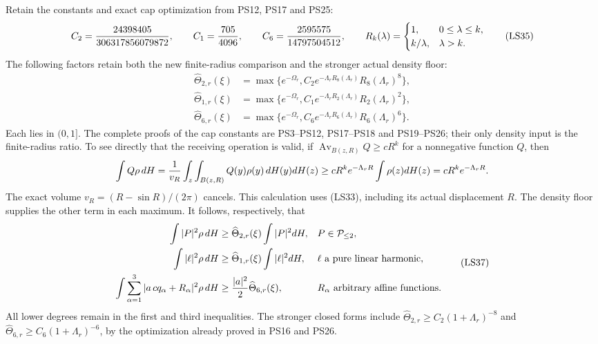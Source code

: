 \documentclass[11pt]{article}
\begin{document}
Retain the constants and exact cap optimization from PS12,
PS17 and PS25:
\[
 C_2={24398405\over306317856079872},\qquad
 C_1={705\over4096},\qquad
 C_6={2595575\over14797504512},\qquad
 R_k(\lambda)=
 \begin{cases}1,&0\le\lambda\le k,\\ k/\lambda,&\lambda>k.\end{cases}
 \tag{LS35}
\]
The following factors retain both the new finite-radius comparison
and the stronger actual density floor:
\[
 \begin{aligned}
 \widehat\Theta_{2,r}(\xi)
 &=\max\{e^{-\Omega_r},
             C_2e^{-\Lambda_rR_8(\Lambda_r)}R_8(\Lambda_r)^8\},\\
 \widehat\Theta_{1,r}(\xi)
 &=\max\{e^{-\Omega_r},
             C_1e^{-\Lambda_rR_2(\Lambda_r)}R_2(\Lambda_r)^2\},\\
 \widehat\Theta_{6,r}(\xi)
 &=\max\{e^{-\Omega_r},
             C_6e^{-\Lambda_rR_6(\Lambda_r)}R_6(\Lambda_r)^6\}.
 \end{aligned}
 \tag{LS36}
\]
Each lies in \((0,1]\). The complete proofs of the cap constants
are PS3–PS12, PS17–PS18 and PS19–PS26; their only density input
is the finite-radius ratio. To see directly that the receiving
operation is valid, if
\(\operatorname{Av}_{B(z,R)}Q\ge cR^k\) for a nonnegative
function \(Q\), then
\[
 \int Q\rho\,dH
 ={1\over v_R}\int_z\int_{B(z,R)}Q(y)\rho(y)\,dH(y)dH(z)
 \ge cR^ke^{-\Lambda_rR}\int\rho(z)dH(z)
 =cR^ke^{-\Lambda_rR}.
 \]
The exact volume \(v_R=(R-\sin R)/(2\pi)\) cancels. This
calculation uses (LS33), including its actual displacement \(R\).
The density floor supplies the other term in each maximum.
It follows, respectively, that
\[
 \begin{aligned}
 \int|P|^2\rho\,dH
   &\ge\widehat\Theta_{2,r}(\xi)\int|P|^2dH,
                     &&P\in\mathcal P_{\le2},\\
 \int|\ell|^2\rho\,dH
   &\ge\widehat\Theta_{1,r}(\xi)\int|\ell|^2dH,
                     &&\ell\text{ a pure linear harmonic},\\
 \int\sum_{\alpha=1}^3|a\,cq_\alpha+R_\alpha|^2\rho\,dH
   &\ge{|a|^2\over2}\widehat\Theta_{6,r}(\xi),
                     &&R_\alpha\text{ arbitrary affine functions}.
 \end{aligned}
 \tag{LS37}
\]
All lower degrees remain in the first and third inequalities.
The stronger closed forms include
\(\widehat\Theta_{2,r}\ge C_2(1+\Lambda_r)^{-8}\) and
\(\widehat\Theta_{6,r}\ge C_6(1+\Lambda_r)^{-6}\), by the
optimization already proved in PS16 and PS26.
\end{document}
